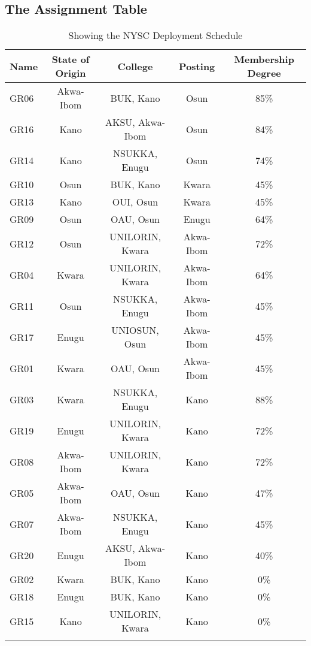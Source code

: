 \documentclass[a4paper,openany]{book}
\begin{document}
				\subsection{The Assignment Table}
						\begin{longtable}{|l|c|c|c|c|}
							\hline
							\textbf{Name} & \textbf{State of Origin} & \textbf{College} & \textbf{Posting} & \textbf{Membership Degree} \\
							\hline
							\endhead
							GR06 & Akwa-Ibom & BUK, Kano & Osun & 85\% \\
							\hline
							GR16 & Kano & AKSU, Akwa-Ibom & Osun & 84\% \\
							\hline
							GR14 & Kano & NSUKKA, Enugu & Osun & 74\% \\
							\hline
							GR10 & Osun & BUK, Kano & Kwara & 45\% \\
							\hline
							GR13 & Kano & OUI, Osun & Kwara & 45\% \\
							\hline
							GR09 & Osun & OAU, Osun & Enugu & 64\% \\
							\hline
							GR12 & Osun & UNILORIN, Kwara & Akwa-Ibom & 72\% \\
							\hline
							GR04 & Kwara & UNILORIN, Kwara & Akwa-Ibom & 64\% \\
							\hline
							GR11 & Osun & NSUKKA, Enugu & Akwa-Ibom & 45\% \\
							\hline
							GR17 & Enugu & UNIOSUN, Osun & Akwa-Ibom & 45\% \\
							\hline
							GR01 & Kwara & OAU, Osun & Akwa-Ibom & 45\% \\
							\hline
							GR03 & Kwara & NSUKKA, Enugu & Kano & 88\% \\
							\hline
							GR19 & Enugu & UNILORIN, Kwara & Kano & 72\% \\
							\hline
							GR08 & Akwa-Ibom & UNILORIN, Kwara & Kano & 72\% \\
							\hline
							GR05 & Akwa-Ibom & OAU, Osun & Kano & 47\% \\
							\hline
							GR07 & Akwa-Ibom & NSUKKA, Enugu & Kano & 45\% \\
							\hline
							GR20 & Enugu & AKSU, Akwa-Ibom & Kano & 40\% \\
							\hline
							GR02 & Kwara & BUK, Kano & Kano & 0\% \\
							\hline
							GR18 & Enugu & BUK, Kano & Kano & 0\% \\
							\hline
							GR15 & Kano & UNILORIN, Kwara & Kano & 0\% \\
							\hline
							\caption{Showing the NYSC Deployment Schedule\label{ex:table}}
						\end{longtable}								
\end{document}
